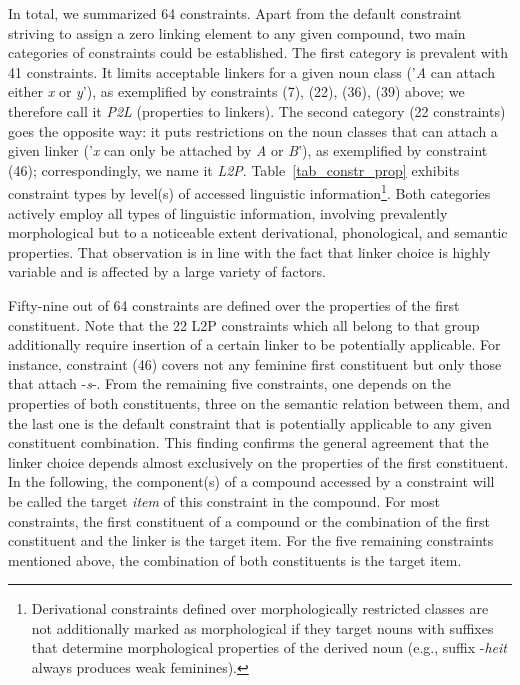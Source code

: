 \documentclass[10pt, a4paper]{article}
\begin{document}

In total, we summarized 64 constraints. Apart from the default constraint striving to assign a zero linking element to any given compound, two main categories of constraints could be established. The first category is prevalent with 41 constraints. It limits acceptable linkers for a given noun class ('\textit{A} can attach either \textit{x} or \textit{y}'), as exemplified by constraints (7), (22), (36), (39) above; we therefore call it \textit{P2L} (properties to linkers). The second category (22 constraints) goes the opposite way: it puts restrictions on the noun classes that can attach a given linker ('\textit{x} can only be attached by \textit{A} or \textit{B}'), as exemplified by constraint (46); correspondingly, we name it \textit{L2P}. Table~\ref{tab_constr_prop} exhibits constraint types by level(s) of accessed linguistic information\footnote{Derivational constraints defined over morphologically restricted classes are not additionally marked as morphological if they target nouns with suffixes that determine morphological properties of the derived noun (e.g., suffix -\textit{heit} always produces weak feminines).}. Both categories actively employ all types of linguistic information, involving prevalently morphological but to a noticeable extent derivational, phonological, and semantic properties. That observation is in line with the fact that linker choice is highly variable and is affected by a large variety of factors.

Fifty-nine out of 64 constraints are defined over the properties of the first constituent. Note that the 22 L2P constraints which all belong to that group additionally require insertion of a certain linker to be potentially applicable. For instance, constraint (46) covers not any feminine first constituent but only those that attach \mbox{-\textit{s}-}. From the remaining five constraints, one depends on the properties of both constituents, three on the semantic relation between them, and the last one is the default constraint that is potentially applicable to any given constituent combination. This finding confirms the general agreement that the linker choice depends almost exclusively on the properties of the first constituent. In the following, the component(s) of a compound accessed by a constraint will be called the target \textit{item} of this constraint in the compound. For most constraints, the first constituent of a compound or the combination of the first constituent and the linker is the target item. For the five remaining constraints mentioned above, the combination of both constituents is the target item.
\end{document}
